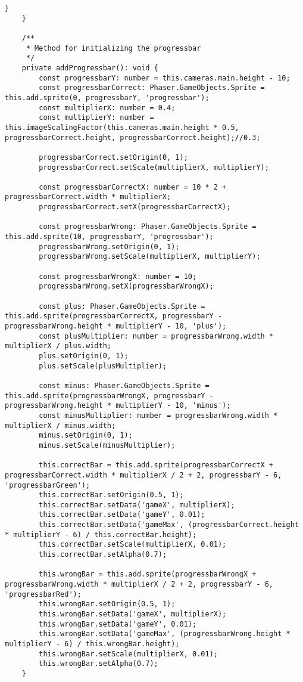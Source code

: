 \begin{lstlisting}[style=TypeScript, caption={propertySortingScene.ts}]
        }
    }

    /**
     * Method for initializing the progressbar
     */
    private addProgressbar(): void {
        const progressbarY: number = this.cameras.main.height - 10;
        const progressbarCorrect: Phaser.GameObjects.Sprite = this.add.sprite(0, progressbarY, 'progressbar');
        const multiplierX: number = 0.4;
        const multiplierY: number = this.imageScalingFactor(this.cameras.main.height * 0.5, progressbarCorrect.height, progressbarCorrect.height);//0.3;

        progressbarCorrect.setOrigin(0, 1);
        progressbarCorrect.setScale(multiplierX, multiplierY);

        const progressbarCorrectX: number = 10 * 2 + progressbarCorrect.width * multiplierX;
        progressbarCorrect.setX(progressbarCorrectX);

        const progressbarWrong: Phaser.GameObjects.Sprite = this.add.sprite(10, progressbarY, 'progressbar');
        progressbarWrong.setOrigin(0, 1);
        progressbarWrong.setScale(multiplierX, multiplierY);

        const progressbarWrongX: number = 10;
        progressbarWrong.setX(progressbarWrongX);

        const plus: Phaser.GameObjects.Sprite = this.add.sprite(progressbarCorrectX, progressbarY - progressbarWrong.height * multiplierY - 10, 'plus');
        const plusMultiplier: number = progressbarWrong.width * multiplierX / plus.width;
        plus.setOrigin(0, 1);
        plus.setScale(plusMultiplier);

        const minus: Phaser.GameObjects.Sprite = this.add.sprite(progressbarWrongX, progressbarY - progressbarWrong.height * multiplierY - 10, 'minus');
        const minusMultiplier: number = progressbarWrong.width * multiplierX / minus.width;
        minus.setOrigin(0, 1);
        minus.setScale(minusMultiplier);

        this.correctBar = this.add.sprite(progressbarCorrectX + progressbarCorrect.width * multiplierX / 2 + 2, progressbarY - 6, 'progressbarGreen');
        this.correctBar.setOrigin(0.5, 1);
        this.correctBar.setData('gameX', multiplierX);
        this.correctBar.setData('gameY', 0.01);
        this.correctBar.setData('gameMax', (progressbarCorrect.height * multiplierY - 6) / this.correctBar.height);
        this.correctBar.setScale(multiplierX, 0.01);
        this.correctBar.setAlpha(0.7);

        this.wrongBar = this.add.sprite(progressbarWrongX + progressbarWrong.width * multiplierX / 2 + 2, progressbarY - 6, 'progressbarRed');
        this.wrongBar.setOrigin(0.5, 1);
        this.wrongBar.setData('gameX', multiplierX);
        this.wrongBar.setData('gameY', 0.01);
        this.wrongBar.setData('gameMax', (progressbarWrong.height * multiplierY - 6) / this.wrongBar.height);
        this.wrongBar.setScale(multiplierX, 0.01);
        this.wrongBar.setAlpha(0.7);
    }


\end{lstlisting}
